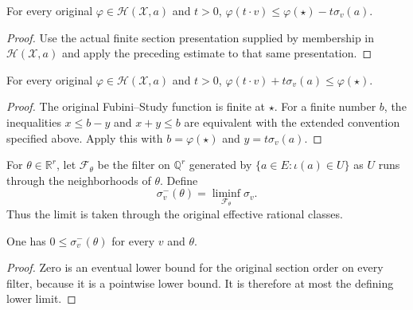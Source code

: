 \begin{lemma}
\label{lem:fp-fs-ray}
\leanok
{}
For every original $\varphi\in\mathcal H(\mathcal X,a)$ and $t>0$,
$\varphi(t\cdot v)\le\varphi(\star)-t\sigma_v(a)$.
\end{lemma}
\begin{proof}
Use the actual finite section presentation supplied by membership in
$\mathcal H(\mathcal X,a)$ and apply the preceding estimate to that
same presentation.
\end{proof}

\begin{lemma}
\label{lem:fp-fs-additive-ray}
\leanok
{}
For every original $\varphi\in\mathcal H(\mathcal X,a)$ and $t>0$,
$\varphi(t\cdot v)+t\sigma_v(a)\le\varphi(\star)$.
\end{lemma}
\begin{proof}
The original Fubini--Study function is finite at $\star$.  For a finite
number $b$, the inequalities $x\le b-y$ and $x+y\le b$ are equivalent
with the extended convention specified above.  Apply this with
$b=\varphi(\star)$ and $y=t\sigma_v(a)$.
\end{proof}

\begin{definition}
\label{def:fp-relaxed-order}
\leanok
{}
For $\theta\in\mathbb R^r$, let $\mathcal F_\theta$ be the filter
on $\mathbb Q^r$ generated by
$\{a\in E:\iota(a)\in U\}$ as $U$ runs through the neighborhoods
of $\theta$.  Define
\[
 \sigma^-_v(\theta)=\liminf_{\mathcal F_\theta}\sigma_v.
\]
Thus the limit is taken through the original effective rational classes.
\end{definition}

\begin{lemma}
\label{lem:fp-relaxed-nonneg}
\leanok
{}
One has $0\le\sigma^-_v(\theta)$ for every $v$ and $\theta$.
\end{lemma}
\begin{proof}
Zero is an eventual lower bound for the original section order on every
filter, because it is a pointwise lower bound.  It is therefore at most
the defining lower limit.
\end{proof}

